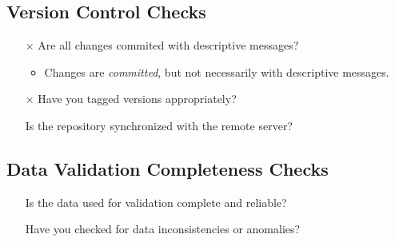 \subsection{Version Control Checks}

\begin{itemize}
\item[$\times$] Are all changes commited with descriptive messages?
  \begin{itemize}
  \item Changes are \textit{committed}, but not necessarily with descriptive messages.
  \end{itemize}
\item[$\times$] Have you tagged versions appropriately?
\item[\checkmark] Is the repository synchronized with the remote server?
\end{itemize}


\subsection{Data Validation Completeness Checks}

\begin{itemize}
\item[\checkmark] Is the data used for validation complete and reliable?
\item[\checkmark] Have you checked for data inconsistencies or anomalies?
\end{itemize}




